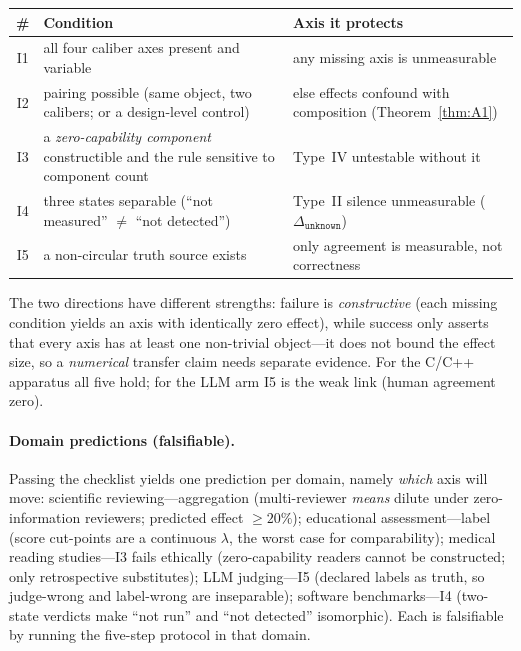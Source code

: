 \documentclass{article}
\newcommand{\unk}{\texttt{unknown}}
\begin{document}
\begin{center}
\small
\begin{tabular}{@{}c p{6.3cm} p{5.4cm}@{}}
\toprule
\# & Condition & Axis it protects \\
\midrule
I1 & all four caliber axes present and variable & any missing axis is unmeasurable \\
I2 & pairing possible (same object, two calibers; or a design-level control) & else effects confound with composition (Theorem~\ref{thm:A1}) \\
I3 & a \emph{zero-capability component} constructible and the rule sensitive to component count & Type~IV untestable without it \\
I4 & three states separable (``not measured'' $\neq$ ``not detected'') & Type~II silence unmeasurable ($\Delta_{\unk}$) \\
I5 & a non-circular truth source exists & only agreement is measurable, not correctness \\
\bottomrule
\end{tabular}
\end{center}

The two directions have different strengths: failure is \emph{constructive} (each missing condition yields
an axis with identically zero effect), while success only asserts that every axis has at least one
non-trivial object---it does not bound the effect size, so a \emph{numerical} transfer claim needs separate
evidence. For the C/C++ apparatus all five hold; for the LLM arm I5 is the weak link (human agreement zero).

\paragraph{Domain predictions (falsifiable).} Passing the checklist yields one prediction per domain, namely
\emph{which} axis will move: scientific reviewing---aggregation (multi-reviewer \emph{means} dilute under
zero-information reviewers; predicted effect $\ge20\%$); educational assessment---label (score cut-points
are a continuous $\lambda$, the worst case for comparability); medical reading studies---I3 fails ethically
(zero-capability readers cannot be constructed; only retrospective substitutes); LLM judging---I5 (declared
labels as truth, so judge-wrong and label-wrong are inseparable); software benchmarks---I4 (two-state
verdicts make ``not run'' and ``not detected'' isomorphic). Each is falsifiable by running the five-step
protocol in that domain.
\end{document}
